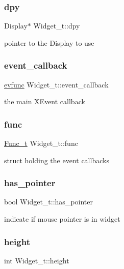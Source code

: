 \subsubsection{\texorpdfstring{dpy}{dpy}}
{\footnotesize\ttfamily Display$\ast$ Widget\+\_\+t\+::dpy}

pointer to the Display to use \mbox{\label{structWidget__t_ae458a38ef1448056b22d9b42f795669b}} 
\subsubsection{\texorpdfstring{event\+\_\+callback}{event\_callback}}
{\footnotesize\ttfamily \hyperlink{xwidget_8h_ab4ae973f86a383c8c0f92b709044520a}{evfunc} Widget\+\_\+t\+::event\+\_\+callback}

the main X\+Event callback \mbox{\label{structWidget__t_a225b9a175e132994a5aa73b59a2911ad}} 
\subsubsection{\texorpdfstring{func}{func}}
{\footnotesize\ttfamily \hyperlink{structFunc__t}{Func\+\_\+t} Widget\+\_\+t\+::func}

struct holding the event callbacks \mbox{\label{structWidget__t_ac8c396c698d816afad49fa751c3ca2c8}} 
\subsubsection{\texorpdfstring{has\+\_\+pointer}{has\_pointer}}
{\footnotesize\ttfamily bool Widget\+\_\+t\+::has\+\_\+pointer}

indicate if mouse pointer is in widget \mbox{\label{structWidget__t_a1def6d2237743e75a0b84ca0c34a6834}} 
\subsubsection{\texorpdfstring{height}{height}}
{\footnotesize\ttfamily int Widget\+\_\+t\+::height}

